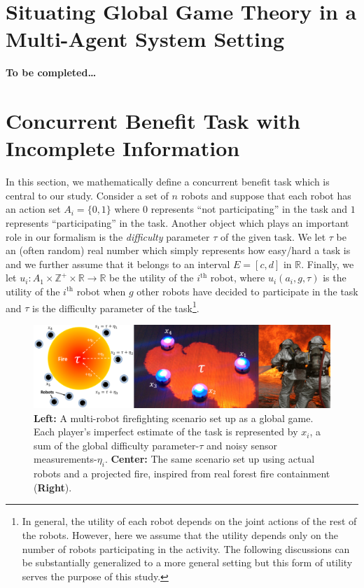 \documentclass[conference]{ieeeconf}
\def\Z{\mathbb{Z}}
\def\R{\mathbb{R}}
\begin{document}
\section{Situating Global Game Theory in a Multi-Agent System Setting}\label{sec:ggmas}
\textbf{To be completed\ldots}


\section{Concurrent Benefit Task with Incomplete Information}\label{sec:conbenefit}
In this section, we mathematically define a concurrent benefit task which is central to our study. Consider a set of $n$ robots and suppose that each robot has an action set $A_i=\{0,1\}$ where $0$ represents ``not participating'' in the task and $1$ represents ``participating'' in the task.  Another object which plays an important role in our formalism is the \textit{difficulty} parameter $\tau$ of the given task. We let $\tau$ be an (often random) real number which simply represents how easy/hard a task is and we further assume that it belongs to an interval $E=[c,d]$ in $\R$.  Finally, we let $u_i:A_1\times\Z^+\times \R\to \R$ be the utility of the $i^{\text{th}}$ robot, where $u_i(a_i,g,\tau)$ is the utility of the $i^{\text{th}}$ robot when $g$ other robots have decided to participate in the task and $\tau$ is the difficulty parameter of the task\footnote{In general, the utility of each robot depends on the joint actions of the rest of the robots. However, here we assume that the utility depends only on the number of robots participating in the activity. The following discussions can be substantially generalized to a more general setting but this form of utility serves the purpose of this study.}. 

\begin{figure}[!tb]
\centering\includegraphics[width=\textwidth]{../figures/dropletfire.png}
\centering\caption{\textbf{Left:} A multi-robot firefighting scenario set up as a global game. Each player's imperfect estimate of the task is represented by $x_i$, a sum of the global difficulty parameter-$\tau$ and noisy sensor measurements-$\eta_i$. \textbf{Center:} The same scenario set up using actual robots and a projected fire, inspired from real forest fire containment (\textbf{Right}).}\label{fig:ggsetup}
\end{figure}
\end{document}
